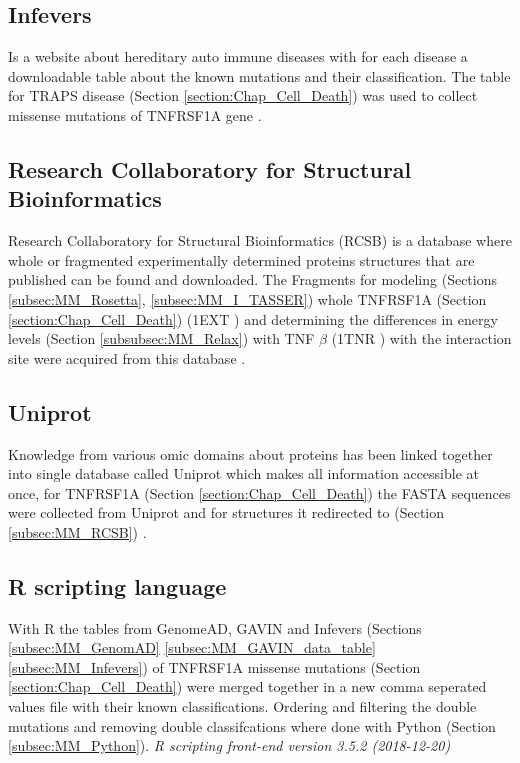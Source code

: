 \subsection{Infevers}
Is a website about hereditary auto immune diseases with for each disease a downloadable table about the known mutations and their classification. The table for TRAPS disease (Section \ref{section:Chap_Cell_Death}) was used to collect missense mutations of TNFRSF1A gene \cite{}.
\label{subsec:MM_Infevers}

\subsection{Research Collaboratory for Structural Bioinformatics}
Research Collaboratory for Structural Bioinformatics (RCSB) is a database where whole or fragmented experimentally determined proteins structures that are published can be found and downloaded. The Fragments for modeling (Sections \ref{subsec:MM_Rosetta}, \ref{subsec:MM_I_TASSER}) whole TNFRSF1A (Section \ref{section:Chap_Cell_Death}) (1EXT \cite{}) and determining the differences in energy levels (Section \ref{subsubsec:MM_Relax}) with TNF $\beta$ (1TNR \cite{}) with the interaction site were acquired from this database \cite{}.
\label{subsec:MM_RCSB}

\subsection{Uniprot}
Knowledge from various omic domains about proteins has been linked together into single database called Uniprot which makes all information accessible at once, for TNFRSF1A (Section \ref{section:Chap_Cell_Death}) the FASTA sequences were collected from Uniprot and for structures it redirected to (Section \ref{subsec:MM_RCSB}) \cite{}.
\label{subsec:MM_Uniprot}

\subsection{R scripting language}
With R the tables from GenomeAD, GAVIN and Infevers (Sections \ref{subsec:MM_GenomAD} \ref{subsec:MM_GAVIN_data_table} \ref{subsec:MM_Infevers}) of TNFRSF1A missense mutations (Section \ref{section:Chap_Cell_Death}) were merged together in a new comma seperated values file with their known classifications. Ordering and filtering the double mutations and removing double classifcations where done with Python (Section \ref{subsec:MM_Python}).
\label{subsec:MM_R}
\newline
\textit{R scripting front-end version 3.5.2 (2018-12-20)}

